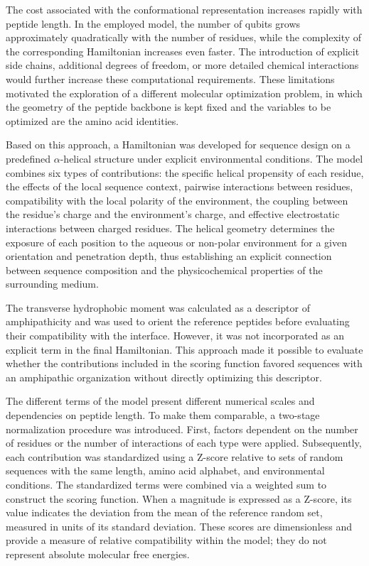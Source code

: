 The cost associated with the conformational representation increases rapidly with peptide length. In the employed model, the number of qubits grows approximately quadratically with the number of residues, while the complexity of the corresponding Hamiltonian increases even faster. The introduction of explicit side chains, additional degrees of freedom, or more detailed chemical interactions would further increase these computational requirements. These limitations motivated the exploration of a different molecular optimization problem, in which the geometry of the peptide backbone is kept fixed and the variables to be optimized are the amino acid identities.

Based on this approach, a Hamiltonian was developed for sequence design on a predefined $\alpha$-helical structure under explicit environmental conditions. The model combines six types of contributions: the specific helical propensity of each residue, the effects of the local sequence context, pairwise interactions between residues, compatibility with the local polarity of the environment, the coupling between the residue's charge and the environment's charge, and effective electrostatic interactions between charged residues. The helical geometry determines the exposure of each position to the aqueous or non-polar environment for a given orientation and penetration depth, thus establishing an explicit connection between sequence composition and the physicochemical properties of the surrounding medium.

The transverse hydrophobic moment was calculated as a descriptor of amphipathicity and was used to orient the reference peptides before evaluating their compatibility with the interface. However, it was not incorporated as an explicit term in the final Hamiltonian. This approach made it possible to evaluate whether the contributions included in the scoring function favored sequences with an amphipathic organization without directly optimizing this descriptor.

The different terms of the model present different numerical scales and dependencies on peptide length. To make them comparable, a two-stage normalization procedure was introduced. First, factors dependent on the number of residues or the number of interactions of each type were applied. Subsequently, each contribution was standardized using a Z-score relative to sets of random sequences with the same length, amino acid alphabet, and environmental conditions. The standardized terms were combined via a weighted sum to construct the scoring function. When a magnitude is expressed as a Z-score, its value indicates the deviation from the mean of the reference random set, measured in units of its standard deviation. These scores are dimensionless and provide a measure of relative compatibility within the model; they do not represent absolute molecular free energies.

